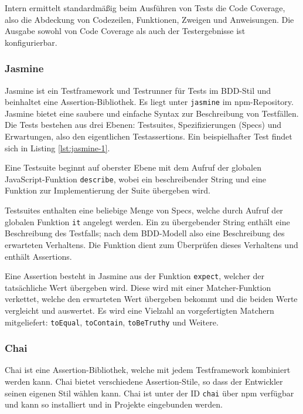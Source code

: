 Intern ermittelt standardmäßig beim Ausführen von Tests die Code Coverage, also die Abdeckung von Codezeilen, Funktionen, Zweigen und Anweisungen. Die Ausgabe sowohl von Code Coverage als auch der Testergebnisse ist konfigurierbar.\cite{intern-userguide}


\subsubsection{Jasmine}
\label{sec:Jasmine}
Jasmine ist ein Testframework und Testrunner für Tests im BDD-Stil und beinhaltet eine Assertion-Bibliothek\cite{jasmine-introduction}. Es liegt unter \texttt{jasmine} im npm-Repository\cite{jasmine-getting-started}. Jasmine bietet eine saubere und einfache Syntax zur Beschreibung von Testfällen. Die Tests bestehen aus drei Ebenen: Testsuites, Spezifizierungen (\glqq Specs\grqq) und Erwartungen, also den eigentlichen Testassertions\cite{jasmine-introduction}. Ein beispielhafter Test findet sich in Listing \ref{lst:jasmine-1}.

Eine Testsuite beginnt auf oberster Ebene mit dem Aufruf der globalen JavaScript-Funktion \texttt{describe}, wobei ein beschreibender String und eine Funktion zur Implementierung der Suite übergeben wird.\cite{jasmine-introduction}

Testsuites enthalten eine beliebige Menge von Specs, welche durch Aufruf der globalen Funktion \texttt{it} angelegt werden. Ein zu übergebender String enthält eine Beschreibung des Testfalls; nach dem BDD-Modell also eine Beschreibung des erwarteten Verhaltens. Die Funktion dient zum Überprüfen dieses Verhaltens und enthält Assertions.\cite{jasmine-introduction}

Eine Assertion besteht in Jasmine aus der Funktion \texttt{expect}, welcher der tatsächliche Wert übergeben wird. Diese wird mit einer Matcher-Funktion verkettet, welche den erwarteten Wert übergeben bekommt und die beiden Werte vergleicht und auswertet. Es wird eine Vielzahl an vorgefertigten Matchern mitgeliefert: \texttt{toEqual}, \texttt{toContain}, \texttt{toBeTruthy} und Weitere\cite{jasmine-introduction, jasmine-cheatsheet}.

\begin{figure}[H]
	
\end{figure}

\subsubsection{Chai}
\label{sec:Chai}
Chai ist eine Assertion-Bibliothek, welche mit jedem Testframework kombiniert werden kann. Chai bietet verschiedene Assertion-Stile, so dass der Entwickler seinen eigenen Stil wählen kann.\cite{chai-index} Chai ist unter der ID \texttt{chai} über npm verfügbar und kann so installiert und in Projekte eingebunden werden\cite{chai-installation}.


